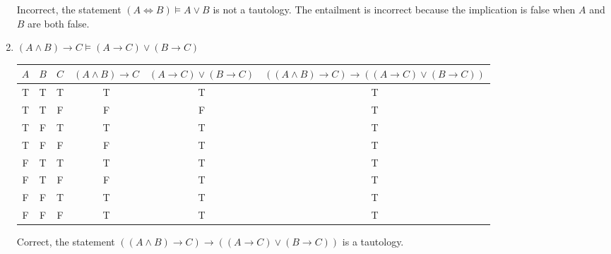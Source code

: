\documentclass{math}
\begin{document}
\begin{enumerate}
  Incorrect, the statement \( (A\Leftrightarrow B)\models A\vee B \) is not
  a tautology. The entailment is incorrect because the implication is false
  when \( A \) and \( B \) are both false.
  \item \( (A\wedge B)\to C\models (A\to C)\vee(B\to C) \)
  \begin{center}
    \begin{tabular}{|c|c|c|c|c|c|}
      \hline
      \( A \) & \( B \) & \( C \) & \( (A\wedge B)\to C \) &
        \( (A\to C)\vee(B\to C) \) &
        \( ((A\wedge B)\to C)\to((A\to C)\vee(B\to C)) \) \\
      \hline
      T & T & T & T & T & T \\
      T & T & F & F & F & T \\
      T & F & T & T & T & T \\
      T & F & F & F & T & T \\
      F & T & T & T & T & T \\
      F & T & F & F & T & T \\
      F & F & T & T & T & T \\
      F & F & F & T & T & T \\
      \hline
    \end{tabular}
  \end{center}
  Correct, the statement \( ((A\wedge B)\to C)\to((A\to C)\vee(B\to C)) \) is a
  tautology.
\end{enumerate}
\end{document}
